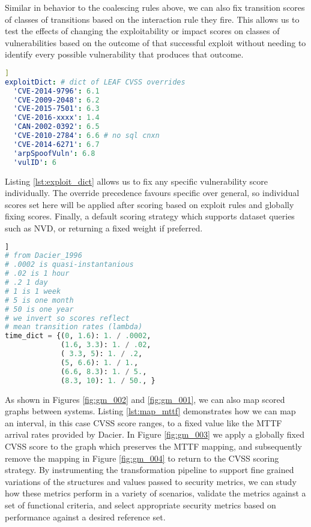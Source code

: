 Similar in behavior to the coalescing rules above, we can also fix transition scores of classes of transitions based on the interaction rule they fire. This allows us to test the effects of changing the exploitability or impact scores on classes of vulnerabilities based on the outcome of that successful exploit without needing to identify every possible vulnerability that produces that outcome.

\begin{lstlisting}[language=yaml, label={lst:exploit_dict}, caption={Override Specific Vulnerability Scores},captionpos=b,]]
exploitDict: # dict of LEAF CVSS overrides
  'CVE-2014-9796': 6.1
  'CVE-2009-2048': 6.2
  'CVE-2015-7501': 6.3
  'CVE-2016-xxxx': 1.4
  'CAN-2002-0392': 6.5
  'CVE-2010-2784': 6.6 # no sql cnxn
  'CVE-2014-6271': 6.7
  'arpSpoofVuln': 6.8
  'vulID': 6
\end{lstlisting}

Listing \ref{lst:exploit_dict} allows us to fix any specific vulnerability score individually. The override precedence favours specific over general, so individual scores set here will be applied after scoring based on exploit rules and globally fixing scores. Finally, a default scoring strategy which supports dataset queries such as NVD, or returning a fixed weight if preferred.

\begin{lstlisting}[language=Python, label={lst:map_mttf}, caption={Map CVSS to MTTF},captionpos=b,]]
# from Dacier_1996
# .0002 is quasi-instantanious
# .02 is 1 hour
# .2 1 day
# 1 is 1 week
# 5 is one month
# 50 is one year
# we invert so scores reflect 
# mean transition rates (lambda)
time_dict = {(0, 1.6): 1. / .0002,
             (1.6, 3.3): 1. / .02,
             ( 3.3, 5): 1. / .2,
             (5, 6.6): 1. / 1.,
             (6.6, 8.3): 1. / 5.,
             (8.3, 10): 1. / 50., }
\end{lstlisting}

As shown in Figures \ref{fig:gm_002} and \ref{fig:gm_001}, we can also map scored graphs between systems. Listing \ref{lst:map_mttf} demonstrates how we can map an interval, in this case CVSS score ranges, to a fixed value like the MTTF arrival rates provided by Dacier\cite{Dacier_Deswarte_Kaaniche_1996a}. In Figure \ref{fig:gm_003} we apply a globally fixed CVSS score to the graph which preserves the MTTF mapping, and subsequently remove the mapping in Figure \ref{fig:gm_004} to return to the CVSS scoring strategy. By instrumenting the transformation pipeline to support fine grained variations of the structures and values passed to security metrics, we can study how these metrics perform in a variety of scenarios, validate the metrics against a set of functional criteria, and select appropriate security metrics based on performance against a desired reference set.
